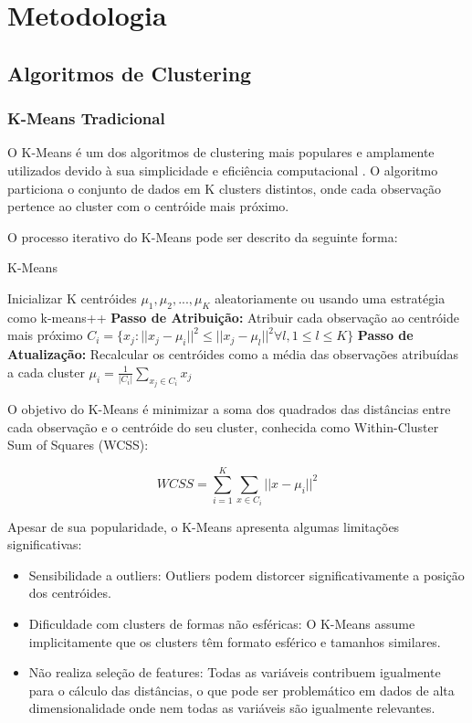 \documentclass[conference]{IEEEtran}
\begin{document}
\section{Metodologia}
\subsection{Algoritmos de Clustering}
\subsubsection{K-Means Tradicional}
O K-Means é um dos algoritmos de clustering mais populares e amplamente utilizados devido à sua simplicidade e eficiência computacional \cite{macqueen1967some}. O algoritmo particiona o conjunto de dados em K clusters distintos, onde cada observação pertence ao cluster com o centróide mais próximo.

O processo iterativo do K-Means pode ser descrito da seguinte forma:

\begin{algorithm}
\caption{K-Means}
\begin{algorithmic}[1]
\STATE Inicializar K centróides $\mu_1, \mu_2, ..., \mu_K$ aleatoriamente ou usando uma estratégia como k-means++
\REPEAT
\STATE \textbf{Passo de Atribuição:} Atribuir cada observação ao centróide mais próximo
\STATE $C_i = \{x_j : ||x_j - \mu_i||^2 \leq ||x_j - \mu_l||^2 \forall l, 1 \leq l \leq K\}$
\STATE \textbf{Passo de Atualização:} Recalcular os centróides como a média das observações atribuídas a cada cluster
\STATE $\mu_i = \frac{1}{|C_i|}\sum_{x_j \in C_i} x_j$
\end{algorithmic}
\end{algorithm}

O objetivo do K-Means é minimizar a soma dos quadrados das distâncias entre cada observação e o centróide do seu cluster, conhecida como Within-Cluster Sum of Squares (WCSS):

\begin{equation}
WCSS = \sum_{i=1}^{K} \sum_{x \in C_i} ||x - \mu_i||^2
\end{equation}

Apesar de sua popularidade, o K-Means apresenta algumas limitações significativas:

\begin{itemize}
    \item Sensibilidade a outliers: Outliers podem distorcer significativamente a posição dos centróides.
    \item Dificuldade com clusters de formas não esféricas: O K-Means assume implicitamente que os clusters têm formato esférico e tamanhos similares.
    \item Não realiza seleção de features: Todas as variáveis contribuem igualmente para o cálculo das distâncias, o que pode ser problemático em dados de alta dimensionalidade onde nem todas as variáveis são igualmente relevantes.
\end{itemize}
\end{document}
